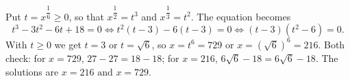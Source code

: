 Put $t=x^{\dfrac{1}{6}}\ge0$, so that $x^{\dfrac{1}{2}}=t^3$ and $x^{\dfrac{1}{3}}=t^2$. The equation becomes
\[
t^3-3t^2-6t+18=0\iff t^2(t-3)-6(t-3)=0\iff(t-3)(t^2-6)=0 .
\]
With $t\ge0$ we get $t=3$ or $t=\sqrt6$, so $x=t^6=729$ or $x=(\sqrt6)^6=216$. Both check: for $x=729$, $27-27=18-18$; for $x=216$, $6\sqrt6-18=6\sqrt6-18$. The solutions are $\boxed{x=216\text{ and }x=729}$.
